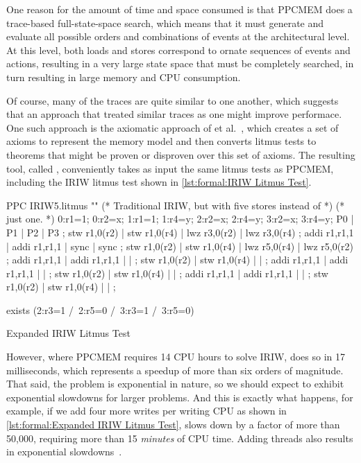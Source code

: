 One reason for the amount of time and space consumed is that PPCMEM does
a trace-based full-state-space search, which means that it must generate
and evaluate all possible orders and combinations of events at the
architectural level.
At this level, both loads and stores correspond to ornate sequences
of events and actions, resulting in a very large state space that must
be completely searched, in turn resulting in large memory and CPU
consumption.

Of course, many of the traces are quite similar to one another, which
suggests that an approach that treated similar traces as one might
improve performace.
One such approach is the axiomatic approach of
 et al.~\cite{Alglave:2014:HCM:2594291.2594347},
which creates a set of axioms to represent the memory model and then
converts litmus tests to theorems that might be proven or disproven
over this set of axioms.
The resulting tool, called ,  conveniently takes as input the
same litmus tests as PPCMEM, including the IRIW litmus test shown in
\cref{lst:formal:IRIW Litmus Test}.

\begin{listing}
\begin{fcvlabel}
\begin{VerbatimL}[commandchars=\%\@\$]
PPC IRIW5.litmus
""
(* Traditional IRIW, but with five stores instead of *)
(* just one.                                         *)
{
0:r1=1; 0:r2=x;
1:r1=1;         1:r4=y;
        2:r2=x; 2:r4=y;
        3:r2=x; 3:r4=y;
}
P0           | P1           | P2           | P3           ;
stw r1,0(r2) | stw r1,0(r4) | lwz r3,0(r2) | lwz r3,0(r4) ;
addi r1,r1,1 | addi r1,r1,1 | sync         | sync         ;
stw r1,0(r2) | stw r1,0(r4) | lwz r5,0(r4) | lwz r5,0(r2) ;
addi r1,r1,1 | addi r1,r1,1 |              |              ;
stw r1,0(r2) | stw r1,0(r4) |              |              ;
addi r1,r1,1 | addi r1,r1,1 |              |              ;
stw r1,0(r2) | stw r1,0(r4) |              |              ;
addi r1,r1,1 | addi r1,r1,1 |              |              ;
stw r1,0(r2) | stw r1,0(r4) |              |              ;

exists
(2:r3=1 /\ 2:r5=0 /\ 3:r3=1 /\ 3:r5=0)
\end{VerbatimL}
\end{fcvlabel}
\caption{Expanded IRIW Litmus Test}
\label{lst:formal:Expanded IRIW Litmus Test}
\end{listing}

However, where PPCMEM requires 14 CPU hours to solve IRIW,  does so
in 17 milliseconds, which represents a speedup of more than six orders
of magnitude.
That said, the problem is exponential in nature, so we should expect
 to exhibit exponential slowdowns for larger problems.
And this is exactly what happens, for example, if we add four more writes
per writing CPU as shown in
\cref{lst:formal:Expanded IRIW Litmus Test},
 slows down by a factor of more than 50,000, requiring more than
15 \emph{minutes} of CPU time.
Adding threads also results in exponential
slowdowns~\cite{PaulEMcKenney2014weakaxiom}.

